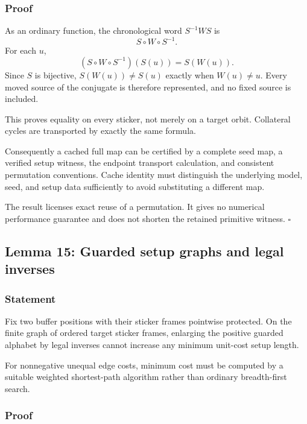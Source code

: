 \documentclass[
  10pt,
  a4paper,
]{article}
\begin{document}
\subsubsection{Proof}\label{proof-13}

As an ordinary function, the chronological word \(S^{-1}WS\) is
\begin{equation}
S\circ W\circ S^{-1}.
\end{equation} For each \(u\), \begin{equation}
(S\circ W\circ S^{-1})(S(u))=S(W(u)).
\end{equation} Since \(S\) is bijective, \(S(W(u))\ne S(u)\) exactly
when \(W(u)\ne u\). Every moved source of the conjugate is therefore
represented, and no fixed source is included.

This proves equality on every sticker, not merely on a target orbit.
Collateral cycles are transported by exactly the same formula.

Consequently a cached full map can be certified by a complete seed map,
a verified setup witness, the endpoint transport calculation, and
consistent permutation conventions. Cache identity must distinguish the
underlying model, seed, and setup data sufficiently to avoid
substituting a different map.

The result licenses exact reuse of a permutation. It gives no numerical
performance guarantee and does not shorten the retained primitive
witness. \(\square\)

\subsection{Lemma 15: Guarded setup graphs and legal
inverses}\label{lemma-15-guarded-setup-graphs-and-legal-inverses}

\subsubsection{Statement}\label{statement-14}

Fix two buffer positions with their sticker frames pointwise protected.
On the finite graph of ordered target sticker frames, enlarging the
positive guarded alphabet by legal inverses cannot increase any minimum
unit-cost setup length.

For nonnegative unequal edge costs, minimum cost must be computed by a
suitable weighted shortest-path algorithm rather than ordinary
breadth-first search.

\subsubsection{Proof}\label{proof-14}
\end{document}
